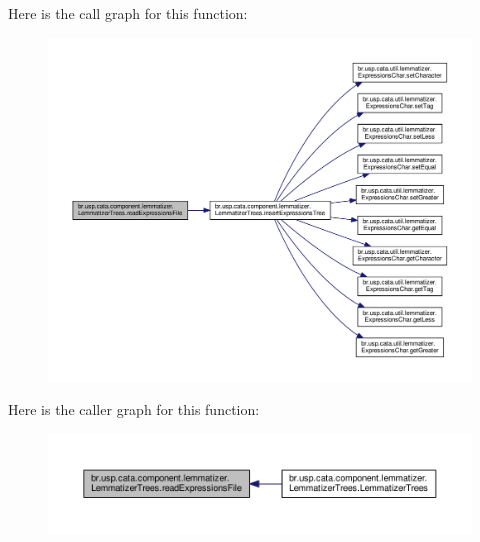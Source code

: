 Here is the call graph for this function\+:\nopagebreak
\begin{figure}[H]
\begin{center}
\leavevmode
\includegraphics[width=350pt]{classbr_1_1usp_1_1cata_1_1component_1_1lemmatizer_1_1_lemmatizer_trees_a6c2d16f7d28382ea3440f0ddf3bdb5c9_cgraph}
\end{center}
\end{figure}




Here is the caller graph for this function\+:\nopagebreak
\begin{figure}[H]
\begin{center}
\leavevmode
\includegraphics[width=350pt]{classbr_1_1usp_1_1cata_1_1component_1_1lemmatizer_1_1_lemmatizer_trees_a6c2d16f7d28382ea3440f0ddf3bdb5c9_icgraph}
\end{center}
\end{figure}



